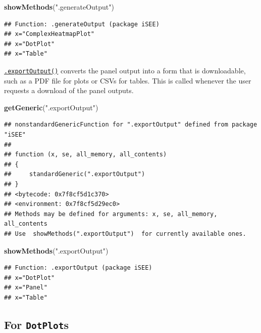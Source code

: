 \documentclass[
]{book}
\newenvironment{Shaded}{\begin{snugshade}}{\end{snugshade}}
\newcommand{\KeywordTok}[1]{\textcolor[rgb]{0.13,0.29,0.53}{\textbf{#1}}}
\newcommand{\NormalTok}[1]{#1}
\newcommand{\StringTok}[1]{\textcolor[rgb]{0.31,0.60,0.02}{#1}}
\begin{document}
\begin{Shaded}
\begin{Highlighting}[]
\KeywordTok{showMethods}\NormalTok{(}\StringTok{".generateOutput"}\NormalTok{)}
\end{Highlighting}
\end{Shaded}

\begin{verbatim}
## Function: .generateOutput (package iSEE)
## x="ComplexHeatmapPlot"
## x="DotPlot"
## x="Table"
\end{verbatim}

\href{https://isee.github.io/iSEE/reference/output-generics.html}{\texttt{.exportOutput()}} converts the panel output into a form that is downloadable, such as a PDF file for plots or CSVs for tables.
This is called whenever the user requests a download of the panel outputs.

\begin{Shaded}
\begin{Highlighting}[]
\KeywordTok{getGeneric}\NormalTok{(}\StringTok{".exportOutput"}\NormalTok{)}
\end{Highlighting}
\end{Shaded}

\begin{verbatim}
## nonstandardGenericFunction for ".exportOutput" defined from package "iSEE"
## 
## function (x, se, all_memory, all_contents) 
## {
##     standardGeneric(".exportOutput")
## }
## <bytecode: 0x7f8cf5d1c370>
## <environment: 0x7f8cf5d29ec0>
## Methods may be defined for arguments: x, se, all_memory, all_contents
## Use  showMethods(".exportOutput")  for currently available ones.
\end{verbatim}

\begin{Shaded}
\begin{Highlighting}[]
\KeywordTok{showMethods}\NormalTok{(}\StringTok{".exportOutput"}\NormalTok{)}
\end{Highlighting}
\end{Shaded}

\begin{verbatim}
## Function: .exportOutput (package iSEE)
## x="DotPlot"
## x="Panel"
## x="Table"
\end{verbatim}

\hypertarget{for-dotplots}{%
\subsection{\texorpdfstring{For \texttt{DotPlot}s}{For DotPlots}}\label{for-dotplots}}
\end{document}
